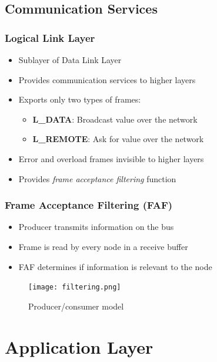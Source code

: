 \documentclass{beamer}
\begin{document}
\subsection{Communication Services}
\begin{frame}
	\frametitle{Logical Link Layer}
	\begin{itemize}
		\item Sublayer of Data Link Layer
		\item Provides communication services to higher layers
		\item Exports only two types of frames:
		\begin{itemize}
			\item \textbf{L\_DATA}: Broadcast value over the network
			\item \textbf{L\_REMOTE}: Ask for value over the network
		\end{itemize}
		\item Error and overload frames invisible to higher layers
		\item Provides \emph{frame acceptance filtering} function
	\end{itemize}
\end{frame}

\begin{frame}
	\frametitle{Frame Acceptance Filtering (FAF)}
	\begin{itemize}
		\item Producer transmits information on the bus
		\item Frame is read by every node in a receive buffer
		\item FAF determines if information is relevant to the node
	\end{itemize}
	
		\begin{figure}
		\texttt{[image: filtering.png]} 
		\caption{Producer/consumer model}%
	\end{figure}
\end{frame}


\section{Application Layer}
\end{document}

